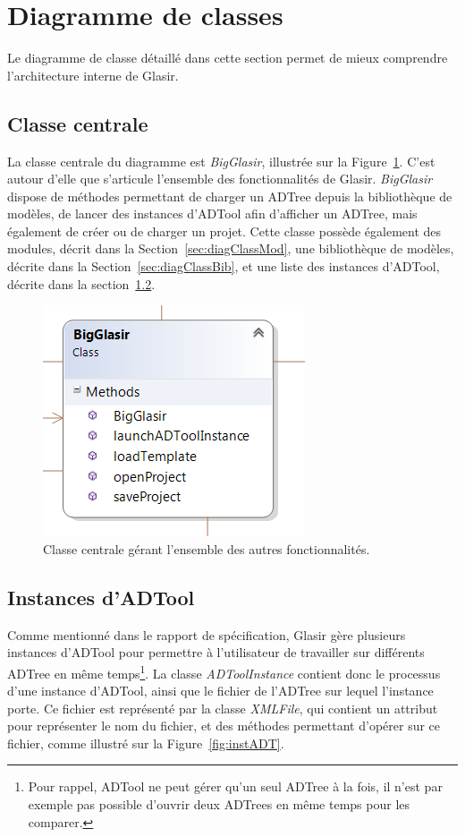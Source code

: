 \section{Diagramme de classes}
    \label{sec:diagClass}
    
    Le diagramme de classe détaillé dans cette section permet de mieux comprendre l'architecture interne de Glasir.
    
    \subsection{Classe centrale}
    	\label{sec:diagClassCentral}
    	La classe centrale du diagramme est \emph{BigGlasir}, illustrée sur la {\sc Figure}~\ref{fig:bigglasir}. C'est autour d'elle que s'articule l'ensemble des fonctionnalités de Glasir. \emph{BigGlasir} dispose de méthodes permettant de charger un ADTree depuis la bibliothèque de modèles, de lancer des instances d'ADTool afin d'afficher un ADTree, mais également de créer ou de charger un projet. Cette classe possède également des modules, décrit dans la {\sc Section}~{\ref{sec:diagClassMod}}, une bibliothèque de modèles, décrite dans la {\sc Section}~{\ref{sec:diagClassBib}}, et une liste des instances d'ADTool, décrite dans la {\sc section}~{\ref{sec:diagClassADT}}.
    	
    	\begin{figure}[H]
	        \centering
	        \includegraphics[height=0.3\textwidth]{figure/bigglasir.png}
	        \caption{Classe centrale gérant l'ensemble des autres fonctionnalités.}
	        \label{fig:bigglasir}
	    \end{figure}
    	
    \subsection{Instances d'ADTool}
    	\label{sec:diagClassADT}
    	
    	Comme mentionné dans le rapport de spécification, Glasir gère plusieurs instances d'ADTool pour permettre à l'utilisateur de travailler sur différents ADTree en même temps\footnote{Pour rappel, ADTool ne peut gérer qu'un seul ADTree à la fois, il n'est par exemple pas possible d'ouvrir deux ADTrees en même temps pour les comparer.}. La classe \emph{ADToolInstance} contient donc le processus d'une instance d'ADTool, ainsi que le fichier de l'ADTree sur lequel l'instance porte. Ce fichier est représenté par la classe \emph{XMLFile}, qui contient un attribut pour représenter le nom du fichier, et des méthodes permettant d'opérer sur ce fichier, comme illustré sur la {\sc Figure}~\ref{fig:instADT}.
    	
